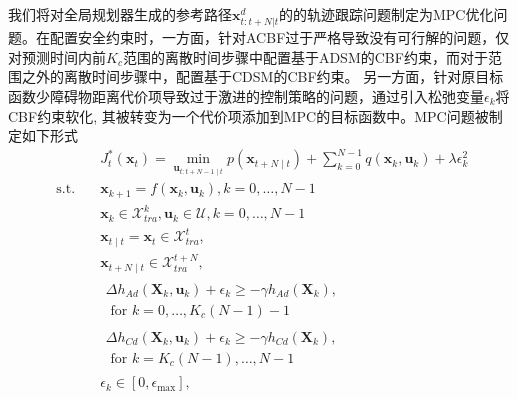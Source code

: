 \documentclass[preprint,5p,times,twocolumn]{elsarticle}
\begin{document}
我们将对全局规划器生成的参考路径$\mathbf{x}_{t: t+N|t}^d$的的轨迹跟踪问题制定为MPC优化问题。在配置安全约束时，一方面，针对ACBF过于严格导致没有可行解的问题，仅对预测时间内前$K_c$范围的离散时间步骤中配置基于ADSM的CBF约束，而对于范围之外的离散时间步骤中，配置基于CDSM的CBF约束\citep{Ma2021FeasibilityEO}。
另一方面，针对原目标函数少障碍物距离代价项导致过于激进的控制策略的问题，通过引入松弛变量$\epsilon_k$将CBF约束软化, 其被转变为一个代价项添加到MPC的目标函数中。MPC问题被制定如下形式
\begin{subequations}
\begin{align}
\label{eq.J_opt}
&J_t^*\left(\boldsymbol{x}_t\right)=\min _{\boldsymbol{u}_{t: t+N-1 \mid t}} p\left(\mathbf{x}_{t+N \mid t}\right)+\sum_{k=0}^{N-1} q\left(\boldsymbol{x}_k, \boldsymbol{u}_k\right) + \lambda \epsilon_k^2\\
\text { s.t.} \quad &\boldsymbol{x}_{k+1}=f(\boldsymbol{x}_{k}, \boldsymbol{u}_{k}),k=0, \ldots, N-1 \label{eq:constraint1}\\
& \boldsymbol{x}_k \in \mathcal{X}_{tra}^k, \boldsymbol{u}_k \in \mathcal{U},k=0, \ldots, N-1 \label{eq:constraint2} \\
& \boldsymbol{x}_{t \mid t}=\boldsymbol{x}_t \in \mathcal{X}_{tra}^t, \label{eq:constraint3} \\
& \boldsymbol{x}_{t+N \mid t} \in \mathcal{X}_{tra}^{t+N}, \label{eq:constraint4} \\
& \begin{aligned} 
\Delta h_{Ad}\left(\boldsymbol{X}_k, \boldsymbol{u}_k\right)+\epsilon_k \geq-\gamma h_{Ad}\left(\boldsymbol{X}_k\right),\\
\text { for } k=0, \ldots, K_c(N-1)-1
\label{eq:constraint5}
\end{aligned} \\
& \begin{aligned} 
\Delta h_{Cd}\left(\boldsymbol{X}_k, \boldsymbol{u}_k\right)+\epsilon_k \geq-\gamma h_{Cd}\left(\boldsymbol{X}_k\right),\\
\text { for } k=K_c(N-1), \ldots, N-1 
\label{eq:constraint6}
\end{aligned} \\
& \epsilon_k \in [0, \epsilon_{\text{max}}], \label{eq:constraint10}
\end{align}
\end{subequations}
\end{document}
